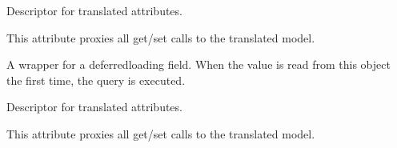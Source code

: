 \documentclass[letterpaper,10pt,english]{sphinxmanual}
\begin{document}
\begin{fulllineitems}
\begin{fulllineitems}
\label{\detokenize{index:core.models.FoodInfo.burger_food_hours_start}}
\pysigstartsignatures
\pysigline
{}
\pysigstopsignatures
\sphinxAtStartPar
Descriptor for translated attributes.

\sphinxAtStartPar
This attribute proxies all get/set calls to the translated model.

\end{fulllineitems}


\begin{fulllineitems}
\label{\detokenize{index:core.models.FoodInfo.id}}
\pysigstartsignatures
\pysigline
{}
\pysigstopsignatures
\sphinxAtStartPar
A wrapper for a deferred\sphinxhyphen{}loading field. When the value is read from this
object the first time, the query is executed.

\end{fulllineitems}


\begin{fulllineitems}
\label{\detokenize{index:core.models.FoodInfo.pizza_food_days}}
\pysigstartsignatures
\pysigline
{}
\pysigstopsignatures
\sphinxAtStartPar
Descriptor for translated attributes.

\sphinxAtStartPar
This attribute proxies all get/set calls to the translated model.

\end{fulllineitems}


\end{fulllineitems}

\end{document}
